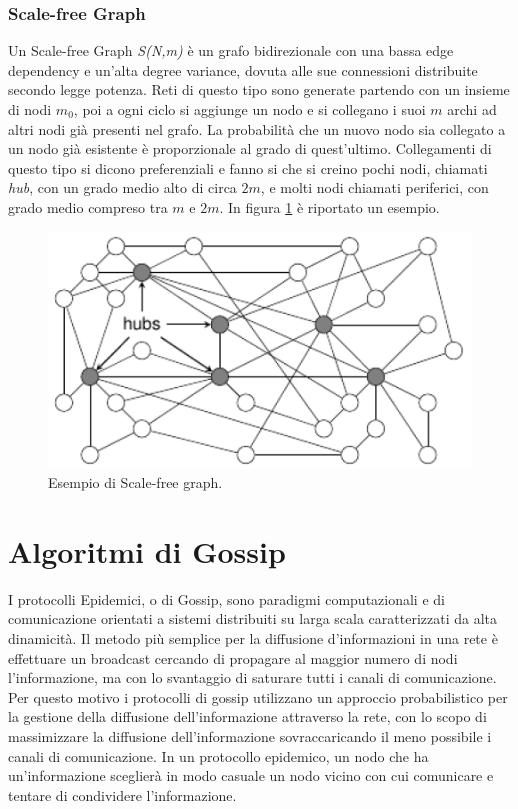 \subsubsection{Scale-free Graph}
Un Scale-free Graph \textit{S(N,m)} è un grafo bidirezionale con una bassa edge dependency e un'alta degree variance, dovuta alle sue connessioni distribuite secondo legge potenza. Reti di questo tipo sono generate partendo con un insieme di nodi $\mathit{m_0}$, poi a ogni ciclo si aggiunge un nodo e si collegano i suoi $\textit{m}$ archi ad altri nodi già presenti nel grafo. La probabilità che un nuovo nodo sia collegato a un nodo già esistente è proporzionale al grado di quest'ultimo. Collegamenti di questo tipo si dicono preferenziali e fanno si che si creino pochi nodi, chiamati \textit{hub}, con un grado medio alto di circa $\textit{2m}$, e molti nodi chiamati periferici, con grado medio compreso tra $\textit{m}$ e $\textit{2m}$. In figura \ref{fig:scale-free} è riportato un esempio.
\bigskip
\begin{figure}[h]
	\centering
	\includegraphics[width=0.7\linewidth,keepaspectratio]{Images/reti/scale-free}
	\caption[Scale-free graph]{Esempio di Scale-free graph\cite{comparisonGAonRT2014-ita}.}
	\label{fig:scale-free}
\end{figure}
\medskip

\section{Algoritmi di Gossip}
I protocolli Epidemici, o di Gossip, sono paradigmi computazionali e di comunicazione orientati a sistemi distribuiti su larga scala caratterizzati da alta dinamicità. Il metodo più semplice per la diffusione d'informazioni in una rete è effettuare un broadcast cercando di propagare al maggior numero di nodi l'informazione, ma con lo svantaggio di saturare tutti i canali di comunicazione. Per questo motivo i protocolli di gossip utilizzano un approccio probabilistico per la gestione della diffusione dell'informazione attraverso la rete, con lo scopo di massimizzare la diffusione dell'informazione sovraccaricando il meno possibile i canali di comunicazione. In un protocollo epidemico, un nodo che ha un'informazione sceglierà in modo casuale un nodo vicino con cui comunicare e tentare di condividere l'informazione.

